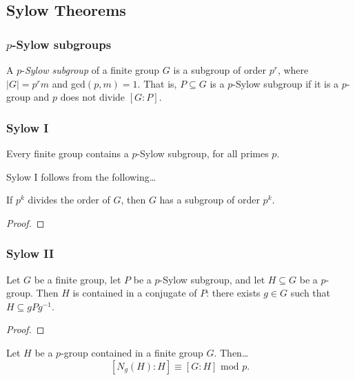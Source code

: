 \subsection{Sylow Theorems}\label{sylowtheorems}

\subsubsection{$p$-Sylow subgroups}\label{sylowsubgroup}
A $p$-\emph{Sylow subgroup} of a finite group $G$ is a subgroup of order $p^r$, where $|G| = p^r m$
and gcd$(p,m) = 1$. That is, $P \subseteq G$ is a $p$-Sylow subgroup if it is a $p$-group and $p$ does
not divide $[G:P]$.

\subsubsection{Sylow I}\label{sylow1}

\begin{theorem}
\label{sylowthm1}
Every finite group contains a $p$-Sylow subgroup, for all primes $p$.
\end{theorem}

\noindent Sylow I follows from the following\dots

\begin{proposition}
If $p^k$ divides the order of $G$, then $G$ has a subgroup of order $p^k$.
\end{proposition}

\begin{proof}

\end{proof}

\subsubsection{Sylow II}\label{sylow2}

\begin{theorem}
\label{sylowthm2}
Let $G$ be a finite group, let $P$ be a $p$-Sylow subgroup, and let $H \subseteq G$ be a $p$-group. Then $H$ is contained
in a conjugate of $P$: there exists $g \in G$ such that $H \subseteq gPg^{-1}$.
\end{theorem}

\begin{proof}

\end{proof}

\begin{lemma}
Let $H$ be a $p$-group contained in a finite group $G$. Then\dots
$$[N_g(H) : H] \equiv [G : H] \textrm{ mod } p.$$
\end{lemma}

